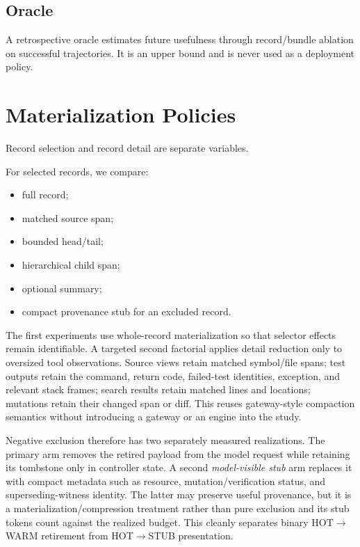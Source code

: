 \documentclass[11pt]{article}
\begin{document}
\subsection{Oracle}

A retrospective oracle estimates future usefulness through record/bundle
ablation on successful trajectories. It is an upper bound and is never used as
a deployment policy.

\section{Materialization Policies}

Record selection and record detail are separate variables.

For selected records, we compare:
\begin{itemize}[leftmargin=*]
    \item full record;
    \item matched source span;
    \item bounded head/tail;
    \item hierarchical child span;
    \item optional summary;
    \item compact provenance stub for an excluded record.
\end{itemize}

The first experiments use whole-record materialization so that selector effects
remain identifiable. A targeted second factorial applies detail reduction only
to oversized tool observations. Source views retain matched symbol/file spans;
test outputs retain the command, return code, failed-test identities, exception,
and relevant stack frames; search results retain matched lines and locations;
mutations retain their changed span or diff. This reuses gateway-style
compaction semantics without introducing a gateway or an engine into the study.

Negative exclusion therefore has two separately measured realizations. The
primary arm removes the retired payload from the model request while retaining
its tombstone only in controller state. A second \emph{model-visible stub} arm
replaces it with compact metadata such as resource, mutation/verification
status, and superseding-witness identity. The latter may preserve useful
provenance, but it is a materialization/compression treatment rather than pure
exclusion and its stub tokens count against the realized budget. This cleanly
separates binary HOT$\rightarrow$WARM retirement from
HOT$\rightarrow$STUB presentation.
\end{document}
